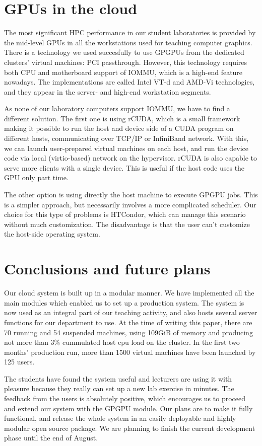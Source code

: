 \documentclass{llncs}
\begin{document}
   
   \section{GPUs in the cloud}
   The most significant HPC performance in our student laboratories is provided by the mid-level GPUs in all the workstations used for teaching computer graphics. There is a technology we used succesfully to use GPGPUs from the dedicated clusters' virtual machines: PCI passthrough.\cite{yang2012implementation} However, this technology requires both CPU and motherboard support of IOMMU, which is a high-end feature nowadays. The implementations are called Intel VT-d and AMD-Vi technologies, and they appear in the server- and high-end workstation segments.

   As none of our laboratory computers support IOMMU, we have to find a different solution. The first one is using rCUDA, which is a small framework making it possible to run the host and device side of a CUDA program on different hosts, communicating over TCP/IP or InfiniBand network.\cite{duato2011enabling} With this, we can launch user-prepared virtual machines on each host, and run the device code via local (virtio-based) network on the hypervisor. rCUDA is also capable to serve more clients with a single device. This is useful if the host code uses the GPU only part time.

   The other option is using directly the host machine to execute GPGPU jobs. This is a simpler approach, but necessarily involves a more complicated scheduler. Our choice for this type of problems is HTCondor, which can manage this scenario without much customization. The disadvantage is that the user can't customize the host-side operating system.


   \section*{Conclusions and future plans}
   Our cloud system is built up in a modular manner. We have implemented all the main modules which enabled us to set up a production system. The system is now used as an integral part of our teaching activity, and also hosts several server functions for our department to use. At the time of writing this paper, there are 70 running and 54 suspended machines, using 109GiB of memory and producing not more than 3{\%} cummulated host cpu load on the cluster. In the first two months' production run, more than 1500 virtual machines have been launched by 125 users.

   The students have found the system useful and lecturers are using it with pleasure because they really can set up a new lab exercise in minutes. The feedback from the users is absolutely positive, which encourages us to proceed and extend our system with the GPGPU module. Our plans are to make it fully functional, and release the whole system in an easily deployable and highly modular open source package. We are planning to finish the current development phase until the end of August. 





\end{document}
